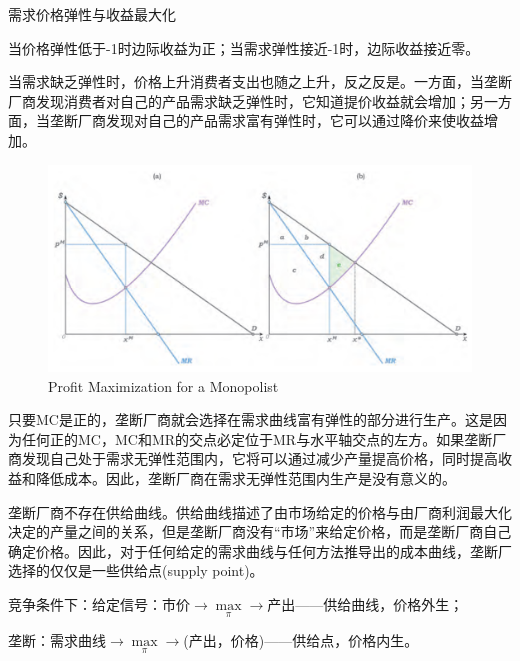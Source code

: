 \documentclass{article}
\begin{document}
\hspace*{\fill}

需求价格弹性与收益最大化

当价格弹性低于-1时边际收益为正；当需求弹性接近-1时，边际收益接近零。

当需求缺乏弹性时，价格上升消费者支出也随之上升，反之反是。一方面，当垄断厂商发现消费者对自己的产品需求缺乏弹性时，它知道提价收益就会增加；另一方面，当垄断厂商发现对自己的产品需求富有弹性时，它可以通过降价来使收益增加。

\begin{figure}[H] %
	\centering %
	\includegraphics[width=1\textwidth]{23_2} %
	\caption{Profit Maximization for a Monopolist} %
	\label{Fig.main3} %
\end{figure}

只要MC是正的，垄断厂商就会选择在需求曲线富有弹性的部分进行生产。这是因为任何正的MC，MC和MR的交点必定位于MR与水平轴交点的左方。如果垄断厂商发现自己处于需求无弹性范围内，它将可以通过减少产量提高价格，同时提高收益和降低成本。因此，垄断厂商在需求无弹性范围内生产是没有意义的。

\hspace*{\fill}

垄断厂商不存在供给曲线。供给曲线描述了由市场给定的价格与由厂商利润最大化决定的产量之间的关系，但是垄断厂商没有“市场”来给定价格，而是垄断厂商自己确定价格。因此，对于任何给定的需求曲线与任何方法推导出的成本曲线，垄断厂选择的仅仅是一些供给点(supply point)。

\hspace*{\fill}

竞争条件下：给定信号：市价$\rightarrow\max\limits_{\pi}\rightarrow$产出——供给曲线，价格外生；

垄断：需求曲线$\rightarrow\max\limits_{\pi}\rightarrow$(产出，价格)——供给点，价格内生。
\end{document}
